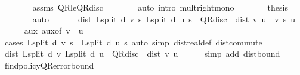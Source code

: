 \begin{isabellebody}
\ \ \ \ \ \ \isamarkupfalse%
\ assms\ QR{\isacharunderscore}{\kern0pt}le{\isacharunderscore}{\kern0pt}QR{\isacharunderscore}{\kern0pt}disc\isanewline
\ \ \ \ \ \ \isamarkupfalse%
\ {\isacharparenleft}{\kern0pt}auto\ intro{\isacharbang}{\kern0pt}{\isacharcolon}{\kern0pt}\ mult{\isacharunderscore}{\kern0pt}right{\isacharunderscore}{\kern0pt}mono{\isacharparenright}{\kern0pt}\isanewline
\ \ \ \ \isamarkupfalse%
\ \isamarkupfalse%
\ {\isacharquery}{\kern0pt}thesis\isanewline
\ \ \ \ \ \ \isamarkupfalse%
\ auto\isanewline
\ \ \isamarkupfalse%
\isanewline
\ \ \isamarkupfalse%
\ {\isachardoublequoteopen}dist\ {\isacharparenleft}{\kern0pt}L{\isacharunderscore}{\kern0pt}split\ d\ v\ s{\isacharparenright}{\kern0pt}\ {\isacharparenleft}{\kern0pt}L{\isacharunderscore}{\kern0pt}split\ d\ u\ s{\isacharparenright}{\kern0pt}\ {\isasymle}\ QR{\isacharunderscore}{\kern0pt}disc\ {\isacharasterisk}{\kern0pt}\ dist\ v\ u{\isachardoublequoteclose}\ \ v\ s\ u\isanewline
\ \ \ \ \isamarkupfalse%
\ aux\ aux{\isacharbrackleft}{\kern0pt}of\ v\ {\isacharunderscore}{\kern0pt}\ u{\isacharbrackright}{\kern0pt}\isanewline
\ \ \ \ \isamarkupfalse%
\ {\isacharparenleft}{\kern0pt}cases\ {\isachardoublequoteopen}L{\isacharunderscore}{\kern0pt}split\ d\ v\ s\ {\isasymge}\ L{\isacharunderscore}{\kern0pt}split\ d\ u\ s{\isachardoublequoteclose}{\isacharparenright}{\kern0pt}\ {\isacharparenleft}{\kern0pt}auto\ simp{\isacharcolon}{\kern0pt}\ dist{\isacharunderscore}{\kern0pt}real{\isacharunderscore}{\kern0pt}def\ dist{\isacharunderscore}{\kern0pt}commute{\isacharparenright}{\kern0pt}\isanewline
\ \ \isamarkupfalse%
\ {\isachardoublequoteopen}dist\ {\isacharparenleft}{\kern0pt}L{\isacharunderscore}{\kern0pt}split\ d\ v{\isacharparenright}{\kern0pt}\ {\isacharparenleft}{\kern0pt}L{\isacharunderscore}{\kern0pt}split\ d\ u{\isacharparenright}{\kern0pt}\ {\isasymle}\ QR{\isacharunderscore}{\kern0pt}disc\ {\isacharasterisk}{\kern0pt}\ dist\ v\ u{\isachardoublequoteclose}\isanewline
\ \ \ \ \isamarkupfalse%
\ {\isacharparenleft}{\kern0pt}simp\ add{\isacharcolon}{\kern0pt}\ dist{\isacharunderscore}{\kern0pt}bound{\isacharparenright}{\kern0pt}\isanewline
{}\isamarkupfalse%
%
\endisatagproof
{\isafoldproof}%
%
\isadelimproof
\isanewline
%
\endisadelimproof
\isanewline
{}\isamarkupfalse%
\ find{\isacharunderscore}{\kern0pt}policy{\isacharunderscore}{\kern0pt}QR{\isacharunderscore}{\kern0pt}error{\isacharunderscore}{\kern0pt}bound{\isacharcolon}{\kern0pt}\isanewline

\end{isabellebody}
